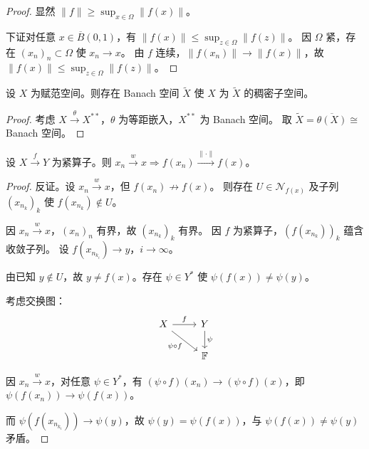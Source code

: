 \documentclass[lang=cn,a4paper,newtx,section]{elegantbook}
\begin{document}
\begin{proof}
  显然 $\|f\|\ge\sup_{x\in\Omega}\|f(x)\|$。
  
  下证对任意 $x\in\overline{B}(0,1)$，有 $\|f(x)\|\le\sup_{z\in\Omega}\|f(z)\|$。
  因 $\Omega$ 紧，存在 $(x_n)_n\subset\Omega$ 使 $x_n\to x$。
  由 $f$ 连续，$\|f(x_n)\|\to\|f(x)\|$，故 $\|f(x)\|\le\sup_{z\in\Omega}\|f(z)\|$。
\end{proof}

\begin{theorem}[赋范空间的完备化]
  设 $X$ 为赋范空间。则存在 Banach 空间 $\tilde{X}$ 使 $X$ 为 $\tilde{X}$ 的稠密子空间。
\end{theorem}

\begin{proof}
  考虑 $X\xrightarrow{\theta}X^{**}$，$\theta$ 为等距嵌入，$X^{**}$ 为 Banach 空间。
  取 $\tilde{X}=\overline{\theta(X)}\cong$ Banach 空间。
\end{proof}

\begin{theorem}
  设 $X\xrightarrow{f}Y$ 为紧算子。则 $x_n\xrightarrow{w}x\Longrightarrow f(x_n)\xrightarrow{\|\cdot\|}f(x)$。
\end{theorem}

\begin{proof}
  反证。设 $x_n\xrightarrow{w}x$，但 $f(x_n)\not\to f(x)$。
  则存在 $U\in\mathcal{N}_{f(x)}$ 及子列 $(x_{n_k})_k$ 使 $f(x_{n_k})\notin U$。
  
  因 $x_n\xrightarrow{w}x$，$(x_n)_n$ 有界，故 $(x_{n_k})_k$ 有界。
  因 $f$ 为紧算子，$(f(x_{n_k}))_k$ 蕴含收敛子列。
  设 $f(x_{n_{k_i}})\to y$，$i\to\infty$。
  
  由已知 $y\notin U$，故 $y\ne f(x)$。存在 $\psi\in Y^*$ 使 $\psi(f(x))\ne\psi(y)$。
  
  考虑交换图：
  \[
    \begin{tikzcd}
      X \arrow[r,"f"] \arrow[dr,"\psi\circ f"'] & Y \arrow[d,"\psi"] \\
      & \mathbb{F}
    \end{tikzcd}
  \]
  
  因 $x_n\xrightarrow{w}x$，对任意 $\psi\in Y^*$，有 $(\psi\circ f)(x_n)\to(\psi\circ f)(x)$，即 $\psi(f(x_n))\to\psi(f(x))$。
  
  而 $\psi(f(x_{n_{k_i}}))\to\psi(y)$，故 $\psi(y)=\psi(f(x))$，与 $\psi(f(x))\ne\psi(y)$ 矛盾。
\end{proof}
\end{document}
